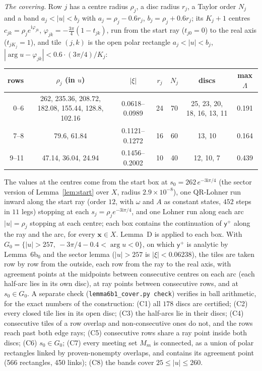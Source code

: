 \documentclass{amsart}
\numberwithin{equation}{section}
\theoremstyle{plain}
\theoremstyle{definition}
\theoremstyle{remark}
\newcommand{\bx}{\mathbf{x}}
\newcommand{\iu}{\mathrm{i}}
\newcommand{\repo}[1]{\texttt{#1}}
\begin{document}
\emph{The covering.} Row $j$ has a centre radius $\rho_j$, a disc radius $r_j$, a Taylor order $N_j$ and a band
$a_j < |u| < b_j$ with $a_j = \rho_j - 0.6r_j$, $b_j = \rho_j + 0.6r_j$; its $K_j + 1$ centres
$c_{jk} = \rho_je^{\iu\varphi_{jk}}$, $\varphi_{jk} = -\tfrac{3\pi}{4}(1 - t_{jk})$, run from the start ray ($t_{j0} = 0$) to the real axis
($t_{jK_j} = 1$), and tile $(j,k)$ is the open polar rectangle $a_j < |u| < b_j$, $|\arg u - \varphi_{jk}| < 0.6\cdot(3\pi/4)/K_j$:
\begin{center}\footnotesize
\begin{tabular}{rcccccc}
\toprule
rows & $\rho_j$ (in $u$) & $|\xi|$ & $r_j$ & $N_j$ & discs & max $\Lambda$ \\
\midrule
0--6 & 262, 235.36, 208.72, 182.08, 155.44, 128.8, 102.16 & 0.0618--0.0989 & 24 & 70 & 25, 23, 20, 18, 16, 13, 11 & 0.191 \\
7--8 & 79.6, 61.84 & 0.1121--0.1272 & 16 & 60 & 13, 10 & 0.164 \\
9--11 & 47.14, 36.04, 24.94 & 0.1456--0.2002 & 10 & 40 & 12, 10, 7 & 0.439 \\
\bottomrule
\end{tabular}
\end{center}
The values at the centres come from the start box at $s_0 = 262\,e^{-3\iu\pi/4}$ (the sector version of
Lemma~\ref{lem:start} over $X$, radius $2.9\times10^{-8}$), one QR-Lohner run inward along the start ray (order $12$, with $\omega$
and $A$ as constant states, $452$ steps in $11$ legs) stopping at each $s_j = \rho_je^{-3\iu\pi/4}$, and one Lohner run along each
arc $|u| = \rho_j$ stopping at each centre; each box contains the continuation of $\mathsf y^+$ along the ray and the arc, for every
$\bx \in X$. Lemma~D is applied to each box. With $G_0 = \{|u| > 257,\ -3\pi/4 - 0.4 < \arg u < 0\}$, on which $\mathsf y^+$ is analytic by
Lemma~6b$_0$ and the sector lemma ($|u| > 257$ is $|\xi| < 0.06238$), the tiles are taken row by row from the outside, each row
from the ray to the real axis, with agreement points at the midpoints between consecutive centres on each arc (each
half-arc lies in its own disc), at ray points between consecutive rows, and at $s_0 \in G_0$. A separate check
(\repo{lemma6b1\_cover.py check}) verifies in ball arithmetic, for the exact numbers of the construction: (C1) all $178$ discs
are certified; (C2) every closed tile lies in its open disc; (C3) the half-arcs lie in their discs; (C4) consecutive tiles of
a row overlap and non-consecutive ones do not, and the rows reach past both edge rays; (C5) consecutive rows share a ray
point inside both discs; (C6) $s_0 \in G_0$; (C7) every meeting set $M_m$ is connected, as a union of polar rectangles linked
by proven-nonempty overlaps, and contains its agreement point (566 rectangles, 450 links); (C8) the bands cover
$25 \le |u| \le 260$.
\end{document}
